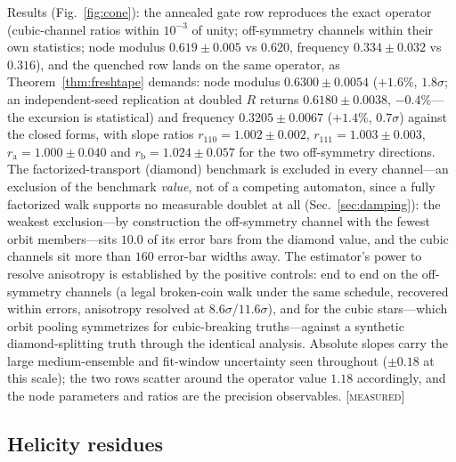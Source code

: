\documentclass[aps,prd,twocolumn,superscriptaddress,nofootinbib,floatfix]{revtex4-2}
\newcommand{\evX}{\textnormal{\textsc{[measured]}}}
\begin{document}
Results (Fig.~\ref{fig:cone}): the annealed gate row reproduces the
exact operator (cubic-channel ratios within $10^{-3}$ of unity;
off-symmetry channels within their own statistics; node modulus
$0.619\pm0.005$ vs $0.620$, frequency $0.334\pm0.032$ vs $0.316$), and
the quenched row lands on the same
operator, as Theorem~\ref{thm:freshtape} demands: node modulus
$0.6300\pm0.0054$ ($+1.6\%$, $1.8\sigma$; an independent-seed
replication at doubled $R$ returns $0.6180\pm0.0038$, $-0.4\%$---the
excursion is statistical) and frequency
$0.3205\pm0.0067$ ($+1.4\%$, $0.7\sigma$) against the closed forms,
with slope ratios $r_{110}=1.002\pm0.002$, $r_{111}=1.003\pm0.003$,
$r_{\mathrm a}=1.000\pm0.040$ and $r_{\mathrm b}=1.024\pm0.057$ for the
two off-symmetry directions. The factorized-transport (diamond)
benchmark is excluded in every channel---an exclusion of the benchmark
\emph{value}, not of a competing automaton, since a fully factorized
walk supports no measurable doublet at all (Sec.~\ref{sec:damping}):
the weakest exclusion---by construction the off-symmetry channel with
the fewest orbit members---sits $10.0$ of its error bars from the
diamond value, and the cubic channels sit more than $160$ error-bar
widths away. The estimator's power to resolve anisotropy is established
by the positive controls: end to end on the off-symmetry channels (a
legal broken-coin walk under the same schedule, recovered within
errors, anisotropy resolved at $8.6\sigma$/$11.6\sigma$), and for the
cubic stars---which orbit pooling symmetrizes for cubic-breaking
truths---against a synthetic diamond-splitting truth through the
identical analysis. Absolute slopes carry the large medium-ensemble and
fit-window uncertainty seen throughout ($\pm0.18$ at this scale); the
two rows scatter around the operator value $1.18$ accordingly, and the
node parameters and ratios are the precision observables. \evX{}

\subsection{Helicity residues}
\end{document}

